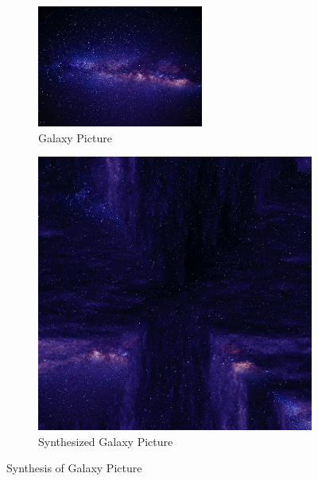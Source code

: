 \documentclass{article}
\begin{document}
\begin{figure}[htbp!]
    \centering
    \begin{subfigure}[b]{0.49\textwidth}
        \centering
        \includegraphics[width=0.6\textwidth]{../Code/Textures/galaxy.png}
        \caption{Galaxy Picture}
        \label{fig:original-galaxy}
    \end{subfigure}
    \hfill %
    \begin{subfigure}[b]{0.49\textwidth}
        \centering
        \includegraphics[width=\textwidth]{../Result/galaxy.png}
        \caption{Synthesized Galaxy Picture}
        \label{fig:synthesized-galaxy}
    \end{subfigure}
    \caption{Synthesis of Galaxy Picture}
    \label{fig:synthesis-galaxy}
\end{figure}
\end{document}
